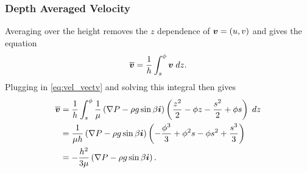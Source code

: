 \subsubsection{Depth Averaged Velocity}
Averaging over the height removes the $z$ dependence of $\boldsymbol{v} = \left( u, v \right)$ and gives the equation 
\begin{align*}
    \overline{\boldsymbol{v}} = \frac{1}{h} \int_{s}^{\phi} \boldsymbol{v} \; dz.
\end{align*}
Plugging in \cref{eq:vel_vectv} and solving this integral then gives 
\begin{align}
    \nonumber \overline{\boldsymbol{v}} &= \frac{1}{h} \int_{s}^{\phi} \frac{1}{\mu} \left( \nabla P - \rho g \sin\beta\boldsymbol{i} \right) \left( \frac{z^2}{2} - \phi z - \frac{s^2}{2} + \phi s \right)  \; dz\\
    \nonumber &= \frac{1}{\mu h} \left( \nabla P - \rho g \sin\beta\boldsymbol{i} \right) \left( -\frac{\phi^3}{3} + \phi^2s - \phi s^2 + \frac{s^3}{3} \right)\\
    &= -\frac{h^2}{3\mu} \left( \nabla P - \rho g \sin\beta\boldsymbol{i} \right).
    \label{eq:uv_bar}
\end{align}

